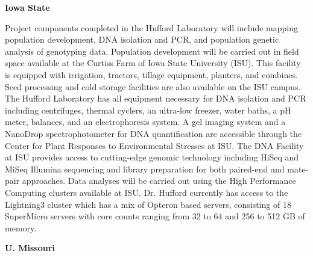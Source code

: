 \textbf{Iowa State}

Project components completed in the Hufford Laboratory will include mapping population development, DNA isolation and PCR, and population genetic analysis of genotyping data. Population development will be carried out in field space available at the Curtiss Farm of Iowa State University (ISU).  This facility is equipped with irrigation, tractors, tillage equipment, planters, and combines.  Seed processing and cold storage facilities are also available on the ISU campus.  The Hufford Laboratory has all equipment necessary for DNA isolation and PCR including centrifuges, thermal cyclers, an ultra-low freezer, water baths, a pH meter, balances, and an electrophoresis system. A gel imaging system and a NanoDrop spectrophotometer for DNA quantification are accessible through the Center for Plant Responses to Environmental Stresses at ISU. The DNA Facility at ISU provides access to cutting-edge genomic technology including HiSeq and MiSeq Illumina sequencing and library preparation for both paired-end and mate-pair approaches.  Data analyses will be carried out using the High Performance Computing clusters available at ISU. Dr. Hufford currently has access to the Lightning3 cluster which has a mix of Opteron based servers, consisting of 18 SuperMicro servers with core counts ranging from 32 to 64 and 256 to 512 GB of memory.

\textbf{U. Missouri}

